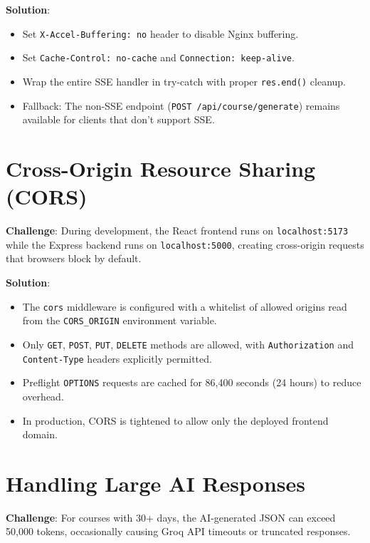 \documentclass[12pt,a4paper]{report}
\begin{document}
\textbf{Solution}:
\begin{itemize}[noitemsep]
    \item Set \texttt{X-Accel-Buffering: no} header to disable Nginx buffering.
    \item Set \texttt{Cache-Control: no-cache} and \texttt{Connection: keep-alive}.
    \item Wrap the entire SSE handler in try-catch with proper \texttt{res.end()} cleanup.
    \item Fallback: The non-SSE endpoint (\texttt{POST /api/course/generate}) remains available for clients that don't support SSE.
\end{itemize}

\section{Cross-Origin Resource Sharing (CORS)}
\textbf{Challenge}: During development, the React frontend runs on \texttt{localhost:5173} while the Express backend runs on \texttt{localhost:5000}, creating cross-origin requests that browsers block by default.

\textbf{Solution}:
\begin{itemize}[noitemsep]
    \item The \texttt{cors} middleware is configured with a whitelist of allowed origins read from the \texttt{CORS\_ORIGIN} environment variable.
    \item Only \texttt{GET}, \texttt{POST}, \texttt{PUT}, \texttt{DELETE} methods are allowed, with \texttt{Authorization} and \texttt{Content-Type} headers explicitly permitted.
    \item Preflight \texttt{OPTIONS} requests are cached for 86{,}400 seconds (24 hours) to reduce overhead.
    \item In production, CORS is tightened to allow only the deployed frontend domain.
\end{itemize}

\section{Handling Large AI Responses}
\textbf{Challenge}: For courses with 30+ days, the AI-generated JSON can exceed 50{,}000 tokens, occasionally causing Groq API timeouts or truncated responses.
\end{document}
